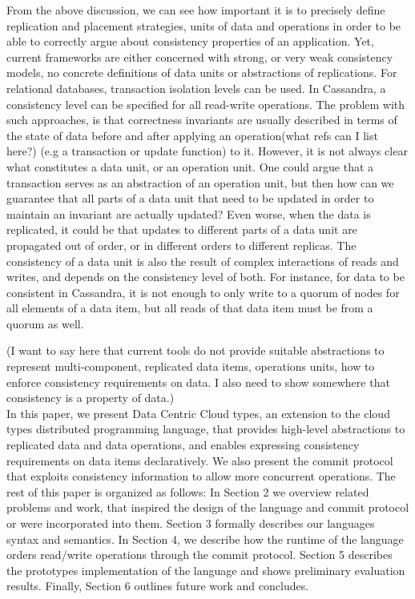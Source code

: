 From the above discussion, we can see how important it is to precisely define
replication and placement strategies, units of data and operations in order to
be able to correctly argue about consistency properties of an application. Yet,
current frameworks are either concerned with strong,
or very weak consistency models, no concrete definitions of data units or
abstractions of replications. For relational databases,
transaction isolation levels can be used. In Cassandra, a consistency level can
be specified for all read-write operations. The problem with such approaches, is
that correctness invariants are usually described in terms of the state of data
before and after applying an operation(what refs can I list here?) 
(e.g a transaction or update function) to
it. However, it is not always clear what constitutes a data unit, or an
operation unit. One could argue that a transaction serves as an abstraction of
an operation unit, but then how can we guarantee that all parts of a data unit
that need to be updated in order to maintain an invariant are actually updated?
Even worse, when the data is replicated, it could be that updates to different
parts of a data unit are propagated out of order, or in different orders to
different replicas. The consistency of a data unit is also the result of complex
interactions of reads and writes, and depends on the consistency level of both.
For instance, for data to be consistent in Cassandra, it is not enough to only
write to a quorum of nodes for all elements of a data item, but all reads of
that data item must be from a quorum as well. 

(I want to say here that current tools do not provide suitable abstractions to
represent multi-component, replicated data items, operations units, how to
enforce consistency requirements on data. I also need to show somewhere that
consistency is a property of data.)\\

In this paper, we present Data Centric Cloud types, an extension to the cloud
types distributed programming language, that provides high-level abstractions to replicated
data and data operations, and enables expressing consistency requirements on
data items declaratively. We also present the commit protocol that exploits
consistency information to allow more concurrent operations. The rest of this paper
is organized as follows: In Section 2 we overview related problems and work,
that inspired the design of the language and commit protocol or were
incorporated into them. Section 3 formally describes our languages syntax and
semantics. In Section 4, we describe how the runtime of the language orders
read/write operations through the commit protocol. Section 5 describes the
prototypes implementation of the language and shows preliminary evaluation
results. Finally, Section 6 outlines future work and concludes. 

